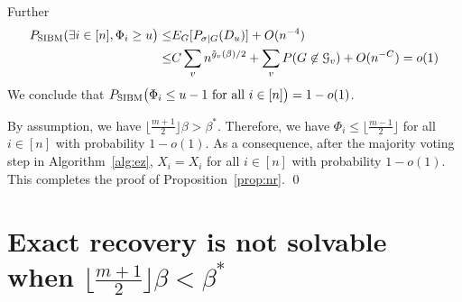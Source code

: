 \documentclass{article}
\begin{document}
Further
\begin{align*}
P_{\operatorname{SIBM}}( \exists i \in [n], \Phi_i \ge u \big)
\leq & E_G[P_{\sigma |G}(D_u)] + O(n^{-4}) \\
\leq &  C\sum_{v} n^{\tilde{g}_v(\beta)/2} + \sum_{v} P(G \not\in \mathcal{G}_v) + O(n^{-C}) = o(1)
\end{align*}
We conclude that $P_{\operatorname{SIBM}} \big(\Phi_i \le u-1 \text{~for all~} i\in[n] \big)=1-o(1)$.

By assumption, we have $\lfloor \frac{m+1}{2} \rfloor \beta>\beta^\ast$.
Therefore, we have $\Phi_i\le \lfloor \frac{m-1}{2} \rfloor$ for all $i\in[n]$ with probability $1-o(1)$.
As a consequence, after the majority voting step in Algorithm~\ref{alg:ez}, $\hat{X}_i=X_i$ for all $i\in[n]$ with probability $1-o(1)$. This completes the proof of Proposition~\ref{prop:nr}.
\hfill\qed
\section{Exact recovery is not solvable when $\lfloor \frac{m+1}{2} \rfloor \beta < \beta^\ast$}\label{sect:converse}
\end{document}
